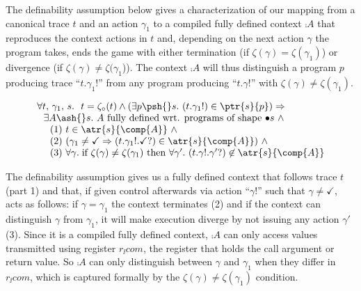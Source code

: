 \documentclass[10pt, conference, compsocconf, letterpaper, times]{IEEEtran}
\begin{document}
The definability assumption\ifsooner{}\fi{}
below gives a characterization of our 
mapping from a canonical trace $t$ and an action $\gamma_1$
to a compiled fully defined context $\comp{A}$
that reproduces the context actions in $t$ and,
depending on the next action $\gamma$ the
program takes, ends the game with either termination (if
$\zeta(\gamma) = \zeta(\gamma_1)$) or divergence
(if $\zeta(\gamma) \not= \zeta(\gamma_1$)).
The context $\comp{A}$ will thus distinguish a program $p$ producing
trace ``$t.\gamma_1!$'' from any program producing ``$t.\gamma!$'' with
$\zeta(\gamma) \not= \zeta(\gamma_1)$.

\begin{assumption}[Definability]
\label{assumption:definability}
\[
\begin{array}{l}
  \forall t,\, \gamma_1,\, s.~~
  t = \zeta_{\circ}(t) \wedge
  (\exists p \psh{}s.~ (t.\gamma_1!) \in \ptr{s}{p}) \Rightarrow \\
  ~~\exists A \ash{}s.~ A\text{ fully defined wrt. programs of shape }{\bullet}s ~\wedge \\
  \text{~~~~(1) }t \in \atr{s}{\comp{A}} ~\wedge \\
  \text{~~~~(2) }( \gamma_1 \neq \checkmark \Rightarrow
    (t.\gamma_1!.\checkmark?) \in \atr{s}{\comp{A}} ) ~\wedge \\
  \text{~~~~(3) }\forall \gamma.\;\text{if }
  \zeta(\gamma) \not= \zeta(\gamma_1) \text{ then } \forall \gamma'.~
  (t.\gamma!.\gamma'?) \not\in \atr{s}{\comp{A}}
\end{array}
\]
\end{assumption}

The definability assumption gives us a fully defined
context that follows trace $t$ (part 1) and that, if given
control afterwards via action ``$\gamma!$'' such that
$\gamma \not= \checkmark$, acts as follows:
if $\gamma = \gamma_1$ the context terminates (2)
and if the context can distinguish $\gamma$ from $\gamma_1$, it
will make execution diverge by not issuing any action $\gamma'$ (3).
Since it is a compiled fully defined context, $\comp{A}$ can only access
values transmitted using register $r_\ii{com}$, the register that
holds the call argument or return value.
So $\comp{A}$ can only distinguish between $\gamma$ and $\gamma_1$
when they differ in $r_\ii{com}$, which is captured formally by
the $\zeta(\gamma) \neq \zeta(\gamma_1)$ condition.
\end{document}
